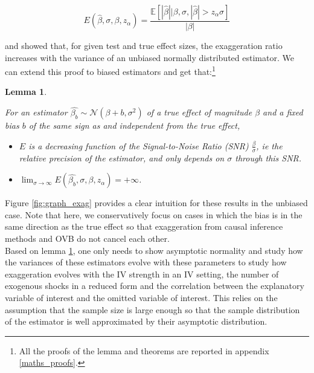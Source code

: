\documentclass[usletter, 12pt]{article}
\newtheorem{lemma}{Lemma}
\begin{document}
				 \begin{equation}\label{exagg_general}
				 	E(\hat{\beta}, \sigma, \beta, z_{\alpha}) =
					 	\dfrac{\mathbb{E}\left[ | \hat{\beta} | \big| \beta, \sigma, |\hat{\beta}| > z_{\alpha} \sigma \right]}{| \beta |} 
				\end{equation}
				
			\cite{lu_note_2019} and \cite{zwet_significance_2021} showed that, for given test and true effect sizes, the exaggeration ratio increases with the variance of an unbiased normally distributed estimator. We can extend this proof to biased estimators and get that:\footnote{All the proofs of the lemma and theorems are reported in appendix \ref{maths_proofs}.}
			
			\begin{lemma}
				\label{lemma_drivers}
			
				For an estimator $\hat{\beta_{b}}  \sim \mathcal{N}(\beta + b, \sigma^{2})$ of a true effect of magnitude $\beta$ and a fixed bias $b$ of the same sign as and independent from the true effect,
				
				\begin{itemize}
					\item $E$ is a decreasing function of the Signal-to-Noise Ratio (SNR) $\frac{\beta}{\sigma}$, \textit{ie} the relative precision of the estimator, and only depends on $\sigma$ through this SNR. 
					\item  $\lim_{\sigma\to \infty} E(\hat{\beta_{b}}, \sigma, \beta, z_{\alpha}) = +\infty$.
				\end{itemize}
			\end{lemma}
			
				Figure \ref{fig:graph_exag} provides a clear intuition for these results in the unbiased case. Note that here, we conservatively focus on cases in which the bias is in the same direction as the true effect so that exaggeration from causal inference methods and OVB do not cancel each other.\\
				 
				 Based on lemma \ref{lemma_drivers}, one only needs to show asymptotic normality and study how the variances of these estimators evolve with these parameters to study how exaggeration evolves with the IV strength in an IV setting, the number of exogenous shocks in a reduced form and the correlation between the explanatory variable of interest and the omitted variable of interest. This relies on the assumption that the sample size is large enough so that the sample distribution of the estimator is well approximated by their asymptotic distribution.
				 				 
\end{document}
